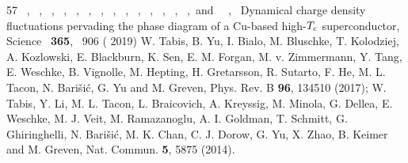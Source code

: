 \documentclass[floatfix,aps,twocolumn,preprintnumbers,superscriptaddress,floatfix,prl]{revtex4-2}
\begin{document}
\begin{thebibliography}{57}
   { {~},  {~},  {~},  {\ },  {\ },  {~},  {~},  {\ },  {\ },  {~},  {~},  {~},  {\ },  {~},\ and\  {~},\ }
  { {Dynamical charge density fluctuations pervading the phase diagram of a {C}u-based high-${T}_{\rm c}$ superconductor},\ }\href@noop {} { { {Science}\ }\textbf { {365}},\  {906} ( {2019})}
  \BibitemOpen
  \href@noop {} {} {W. Tabis, B. Yu, I. Bialo, M. Bluschke, T. Kolodziej, A. Kozlowski, E. Blackburn, K. Sen, E. M. Forgan, M. v. Zimmermann, Y. Tang, E. Weschke, B. Vignolle, M. Hepting, H. Gretarsson, R. Sutarto, F. He, M. L. Tacon, N. Bari{\v{s}}i{\'c}, G. Yu and M. Greven, Phys. Rev. B \textbf{96}, 134510 (2017); W. Tabis, Y. Li, M. L. Tacon, L. Braicovich, A. Kreyssig, M. Minola, G. Dellea, E. Weschke, M. J. Veit, M. Ramazanoglu, A. I. Goldman, T. Schmitt, G. Ghiringhelli, N. Bari{\v{s}}i{\'c}, M. K. Chan, C. J. Dorow, G. Yu, X. Zhao, B. Keimer and M. Greven, Nat. Commun. \textbf{5}, 5875 (2014).}
  \BibitemOpen

\end{thebibliography}
\end{document}
